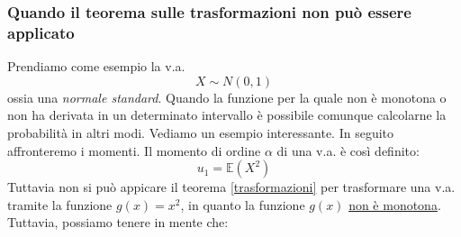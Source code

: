 
\subsubsection*{Quando il teorema sulle trasformazioni non può essere applicato}
Prendiamo come esempio la v.a.
\[
	X \sim N\left(0,1\right)
\]
ossia una \textit{normale standard}.
Quando la funzione per la quale non è monotona o non ha derivata in un determinato intervallo è possibile comunque calcolarne la probabilità in altri modi. Vediamo un esempio interessante. In seguito affronteremo i momenti. Il momento di ordine $ \alpha $ di una v.a. è così definito:
\[
	u_1=\mathbb{E}\left(X^2 \right)
\]
Tuttavia non si può appicare il teorema \ref{trasformazioni} per trasformare una v.a. tramite la funzione $ g\left(x\right) = x^2  $, in quanto la funzione $ g\left(x\right) $ \underline{non è monotona}. Tuttavia, possiamo tenere in mente che:
